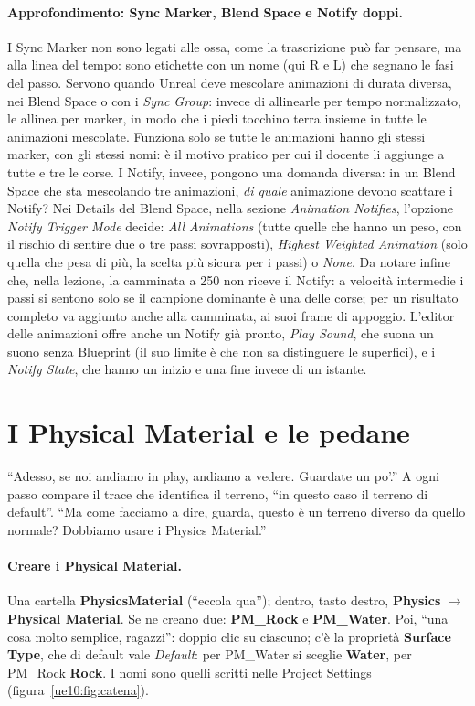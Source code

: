 \paragraph{Approfondimento: Sync Marker, Blend Space e Notify doppi.} I Sync Marker non
sono legati alle ossa, come la trascrizione può far pensare, ma alla linea del tempo:
sono etichette con un nome (qui R e L) che segnano le fasi del passo. Servono quando
Unreal deve mescolare animazioni di durata diversa, nei Blend Space o con i
\emph{Sync Group}: invece di allinearle per tempo normalizzato, le allinea per marker, in
modo che i piedi tocchino terra insieme in tutte le animazioni mescolate. Funziona solo se
tutte le animazioni hanno gli stessi marker, con gli stessi nomi: è il motivo pratico per
cui il docente li aggiunge a tutte e tre le corse. I Notify, invece, pongono una domanda
diversa: in un Blend Space che sta mescolando tre animazioni, \emph{di quale} animazione
devono scattare i Notify? Nei Details del Blend Space, nella sezione \emph{Animation
Notifies}, l'opzione \emph{Notify Trigger Mode} decide: \emph{All Animations} (tutte quelle
che hanno un peso, con il rischio di sentire due o tre passi sovrapposti),
\emph{Highest Weighted Animation} (solo quella che pesa di più, la scelta più sicura per i
passi) o \emph{None}. Da notare infine che, nella lezione, la camminata a 250 non riceve
il Notify: a velocità intermedie i passi si sentono solo se il campione dominante è una
delle corse; per un risultato completo va aggiunto anche alla camminata, ai suoi frame di
appoggio. L'editor delle animazioni offre anche un Notify già pronto,
\emph{Play Sound}, che suona un suono senza Blueprint (il suo limite è che non sa
distinguere le superfici), e i \emph{Notify State}, che hanno un inizio e una fine invece
di un istante.

\section{I Physical Material e le pedane}
\label{ue10:sec:physmat}

``Adesso, se noi andiamo in play, andiamo a vedere. Guardate un po'.'' A ogni passo
compare il trace che identifica il terreno, ``in questo caso il terreno di default''. ``Ma
come facciamo a dire, guarda, questo è un terreno diverso da quello normale? Dobbiamo
usare i Physics Material.''

\paragraph{Creare i Physical Material.} Una cartella \textbf{PhysicsMaterial} (``eccola
qua''); dentro, tasto destro, \textbf{Physics} $\rightarrow$ \textbf{Physical Material}. Se
ne creano due: \textbf{PM\_Rock} e \textbf{PM\_Water}. Poi, ``una cosa molto semplice,
ragazzi'': doppio clic su ciascuno; c'è la proprietà \textbf{Surface Type}, che di default
vale \emph{Default}: per PM\_Water si sceglie \textbf{Water}, per PM\_Rock \textbf{Rock}.
I nomi sono quelli scritti nelle Project Settings (figura~\ref{ue10:fig:catena}).

